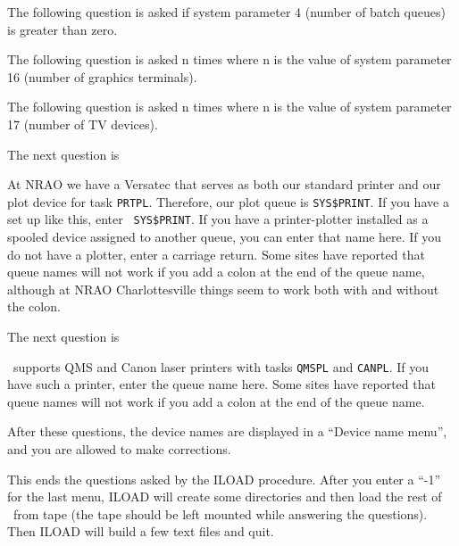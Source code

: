 \noindent
The following question is asked if system parameter 4 (number of batch
queues) is greater than zero.\medskip

\medskip

\noindent
The following question is asked n times where n is the value of system
parameter 16 (number of graphics terminals).\medskip

\medskip

\noindent
The following question is asked n times where n is the value of system
parameter 17 (number of TV devices).\medskip

\medskip

\noindent
The next question is\medskip


\noindent
At NRAO we have a Versatec that serves as both our standard printer
and our plot device for task {\tt PRTPL}.  Therefore, our plot queue
is {\tt SYS\$PRINT}.  If you have a set up like this, enter {\tt
SYS\$PRINT}.  If you have a printer-plotter installed as a spooled
device assigned to another queue, you can enter that name here.  If
you do not have a plotter, enter a carriage return.  Some sites have
reported that queue names will not work if you add a colon at the end
of the queue name, although at NRAO Charlottesville things seem to
work both with and without the colon.

The next question is\medskip


\noindent
\aips\ supports QMS and Canon laser printers with tasks {\tt QMSPL} and
{\tt CANPL}.  If you have such a printer, enter the queue name here.
Some sites have reported that queue names will not work if you add a
colon at the end of the queue name.

After these questions, the device names are displayed in a ``Device name
menu'', and you are allowed to make corrections.

This ends the questions asked by the ILOAD procedure.  After you enter
a ``-1'' for the last menu,  ILOAD will create some directories and then
load the rest of \aips\ from tape (the tape should be left mounted while
answering the questions).  Then ILOAD will build a few text files and
quit.

\medskip{}

